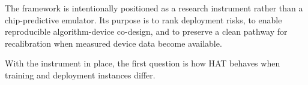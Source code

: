The framework is intentionally positioned as a research instrument rather than a chip-predictive emulator. Its purpose is to rank deployment risks, to enable reproducible algorithm-device co-design, and to preserve a clean pathway for recalibration when measured device data become available.

With the instrument in place, the first question is how HAT behaves when training and deployment instances differ.
